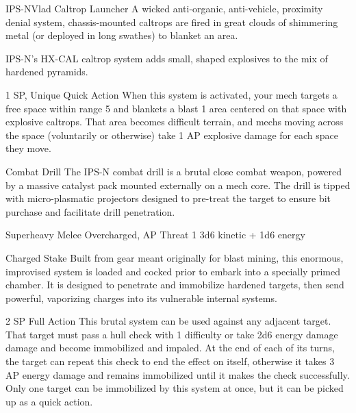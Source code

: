 \begin{mech}{IPS-N}{Vlad}
Caltrop Launcher
A wicked anti-organic, anti-vehicle, proximity denial system, chassis-mounted caltrops are fired in great clouds of shimmering metal (or deployed in long swathes) to blanket an area.

IPS-N’s HX-CAL caltrop system adds small, shaped explosives to the mix of hardened pyramids.

1 SP, Unique
Quick Action
When this system is activated, your mech targets a free space within range 5 and blankets a blast 1 area centered on that space with explosive caltrops. That area becomes difficult terrain, and mechs moving across the space (voluntarily or otherwise) take 1 AP explosive damage for each space they move.

Combat Drill
The IPS-N combat drill is a brutal close combat weapon, powered by a massive catalyst pack mounted externally on a mech core. The drill is tipped with micro-plasmatic projectors designed to pre-treat the target to ensure bit purchase and facilitate drill penetration.

Superheavy Melee
Overcharged, AP
Threat 1
3d6 kinetic + 1d6 energy

Charged Stake
Built from gear meant originally for blast mining, this enormous, improvised system is loaded and cocked prior to embark into a specially primed chamber. It is designed to penetrate and immobilize hardened targets, then send powerful, vaporizing charges into its vulnerable internal systems.

2 SP
Full Action
This brutal system can be used against any adjacent target. That target must pass a hull check with 1 difficulty or take 2d6 energy damage damage and become immobilized and impaled. At the end of each of its turns, the target can repeat this check to end the effect on itself, otherwise it takes 3 AP energy damage and remains immobilized until it makes the check successfully. Only one target can be immobilized by this system at once, but it can be picked up as a quick action.


\end{mech}
